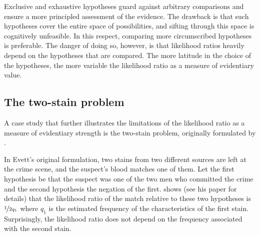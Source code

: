 \documentclass{article}
\begin{document}
Exclusive and exhaustive hypotheses guard against arbitrary comparisons and ensure a more principled  assessment of the evidence. The drawback is that such hypotheses cover the entire space of possibilities, and sifting through this space is cognitively unfeasible. In this respect, comparing more circumscribed hypotheses is preferable. The danger of doing so, however, is that likelihood ratios heavily depend on the hypotheses that are compared. The more latitude in the choice of the hypotheses,
the more variable the likelihood ratio as a measure of evidentiary value. 









 \subsection{The two-stain problem}
\label{subsec:two-stain}


A case study that further illustrates the limitations of 
the likelihood ratio as a measure of evidentiary strength is the 
two-stain problem, originally formulated by \cite{Evett1987}.

In Evett's original formulation, 
two stains from two different sources are left at the crime scene, and the suspect's blood matches one of them. %
Let the first hypothesis be that the suspect was one of the two men who committed the crime and the second hypothesis the negation of the first. 
\cite{Evett1987} shows (see his paper for details) that the likelihood ratio of the match relative to these two hypotheses is $\nicefrac{1}{2q_1}$ where $q_1$ is the estimated frequency  of the characteristics of the first stain. Surprisingly, the likelihood ratio does not depend on the frequency associated with the second stain. 

 
\end{document}
